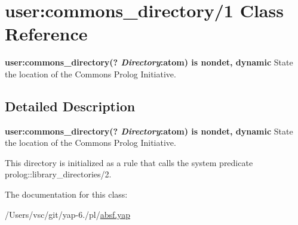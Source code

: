 \hypertarget{classuser_1_1commons__directory_21}{}\section{user\+:commons\+\_\+directory/1 Class Reference}
\label{classuser_1_1commons__directory_21}


{\bfseries  user\+:commons\+\_\+directory(? {\itshape Directory}\+:atom) is nondet, dynamic } State the location of the Commons Prolog Initiative.  




\subsection{Detailed Description}
{\bfseries  user\+:commons\+\_\+directory(? {\itshape Directory}\+:atom) is nondet, dynamic } State the location of the Commons Prolog Initiative. 

This directory is initialized as a rule that calls the system predicate prolog\+::library\+\_\+directories/2. 

The documentation for this class\+:\begin{DoxyCompactItemize}
\item 
/\+Users/vsc/git/yap-\/6./pl/\hyperlink{absf_8yap}{absf.\+yap}\end{DoxyCompactItemize}
